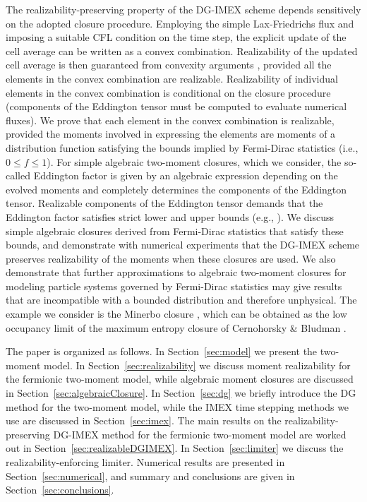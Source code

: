 The realizability-preserving property of the DG-IMEX scheme depends sensitively on the adopted closure procedure.  
Employing the simple Lax-Friedrichs flux and imposing a suitable CFL condition on the time step, the explicit update of the cell average can be written as a convex combination.  
Realizability of the updated cell average is then guaranteed from convexity arguments \cite{zhangShu_2010a}, provided all the elements in the convex combination are realizable.  
Realizability of individual elements in the convex combination is conditional on the closure procedure (components of the Eddington tensor must be computed to evaluate numerical fluxes).  
We prove that each element in the convex combination is realizable, provided the moments involved in expressing the elements are moments of a distribution function satisfying the bounds implied by Fermi-Dirac statistics (i.e., $0\le f \le 1$).  
For simple algebraic two-moment closures, which we consider, the so-called Eddington factor is given by an algebraic expression depending on the evolved moments and completely determines the components of the Eddington tensor.  
Realizable components of the Eddington tensor demands that the Eddington factor satisfies strict lower and upper bounds (e.g., \cite{levermore_1984,lareckiBanach_2011}).  
We discuss simple algebraic closures derived from Fermi-Dirac statistics that satisfy these bounds, and demonstrate with numerical experiments that the DG-IMEX scheme preserves realizability of the moments when these closures are used.  
We also demonstrate that further approximations to algebraic two-moment closures for modeling particle systems governed by Fermi-Dirac statistics may give results that are incompatible with a bounded distribution and therefore unphysical.  
The example we consider is the Minerbo closure \cite{minerbo_1978}, which can be obtained as the low occupancy limit of the maximum entropy closure of Cernohorsky \& Bludman \cite{cernohorskyBludman_1994}.  

The paper is organized as follows.  
In Section~\ref{sec:model} we present the two-moment model.  
In Section~\ref{sec:realizability} we discuss moment realizability for the fermionic two-moment model, while algebraic moment closures are discussed in Section~\ref{sec:algebraicClosure}.  
In Section~\ref{sec:dg} we briefly introduce the DG method for the two-moment model, while the IMEX time stepping methods we use are discussed in Section~\ref{sec:imex}.  
The main results on the realizability-preserving DG-IMEX method for the fermionic two-moment model are worked out in Section~\ref{sec:realizableDGIMEX}.  
In Section~\ref{sec:limiter} we discuss the realizability-enforcing limiter.  
Numerical results are presented in Section~\ref{sec:numerical}, and summary and conclusions are given in Section~\ref{sec:conclusions}.  

\clearpage